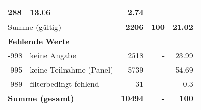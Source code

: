 \begin{longtable}{lXrrr}
       \num{288} &
       \num[round-mode=places,round-precision=2]{13,06} &
         \num[round-mode=places,round-precision=2]{2,74} \\
     \midrule
     \multicolumn{2}{l}{Summe (gültig)} &
       \textbf{\num{2206}} &
     \textbf{100} &
       \textbf{\num[round-mode=places,round-precision=2]{21,02}} \\
     \multicolumn{5}{l}{\textbf{Fehlende Werte}}\\
       -998 &
       keine Angabe &
         \num{2518} &
        - &
         \num[round-mode=places,round-precision=2]{23,99} \\
       -995 &
       keine Teilnahme (Panel) &
         \num{5739} &
        - &
         \num[round-mode=places,round-precision=2]{54,69} \\
       -989 &
       filterbedingt fehlend &
         \num{31} &
        - &
         \num[round-mode=places,round-precision=2]{0,3} \\
     \midrule
     \multicolumn{2}{l}{\textbf{Summe (gesamt)}} &
          \textbf{\num{10494}} &
        \textbf{-} &
        \textbf{100} \\
     \bottomrule
     \end{longtable}
     
